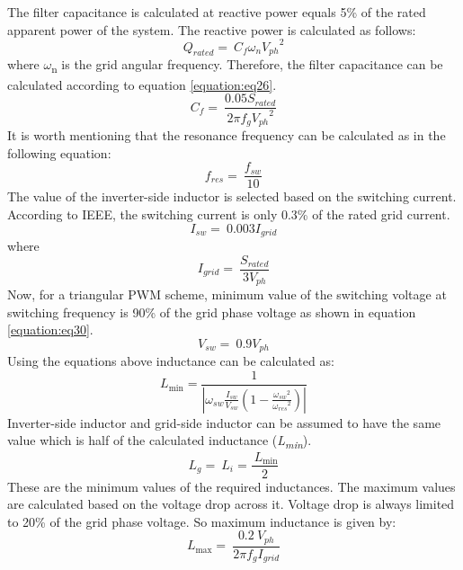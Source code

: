 \documentclass[12pt,a4paper]{book}
\begin{document}
The filter capacitance is calculated at reactive power equals 5\% of the rated apparent power of the system. The reactive power is calculated as follows:
\begin{equation}
  Q_{rated} = \ C_{f}\omega_{n}{V_{ph}}^{2}
  \label{equation:eq25}
\end{equation}
where \(\omega\)\textsubscript{n} is the grid angular frequency. Therefore, the filter capacitance can be calculated according to equation \ref{equation:eq26}.
\begin{equation}
  C_{f} = \ \frac{0.05S_{rated}}{2\pi f_{g}{V_{ph}}^{2}}
  \label{equation:eq26}
\end{equation}
It is worth mentioning that the resonance frequency can be calculated as in the following equation:
\begin{equation}
  f_{res} = \ \frac{f_{sw}}{10}
  \label{equation:eq27}
\end{equation}
The value of the inverter-side inductor is selected based on the switching current. According to IEEE, the switching current is only 0.3\% of the rated grid current.
\begin{equation}
  I_{sw} = \ 0.003I_{grid}
  \label{equation:eq28}
\end{equation}
where
\begin{equation}
  I_{grid} = \ \frac{S_{rated}}{{3V}_{ph}}
  \label{equation:eq29}
\end{equation}
Now, for a triangular PWM scheme, minimum value of the switching voltage at switching frequency is 90\% of the grid phase voltage as shown in equation \ref{equation:eq30}.
\begin{equation}
  V_{sw} = \ 0.9V_{ph}
  \label{equation:eq30}
\end{equation}
Using the equations above inductance can be calculated as:
\begin{equation}
  L_{\min} = \frac{1}{|\omega_{sw}\frac{I_{sw}}{V_{sw}}\left( 1 - \frac{{\omega_{sw}}^{2}}{{\omega_{res}}^{2}} \right)|}
  \label{equation:eq31}
\end{equation}
Inverter-side inductor and grid-side inductor can be assumed to have the same value which is half of the calculated inductance (\emph{L\textsubscript{min}}).
\begin{equation}
  L_{g} = \ L_{i} = \frac{\ L_{\min}}{2}
  \label{equation:eq32}
\end{equation}
These are the minimum values of the required inductances. The maximum values are calculated based on the voltage drop across it. Voltage drop is always limited to 20\% of the grid phase voltage. So maximum inductance is given by:
\begin{equation}
  L_{\max} = \ \frac{0.2\ V_{ph}}{2\pi f_{g}I_{grid}}
  \label{equation:eq33}
\end{equation}
\end{document}
